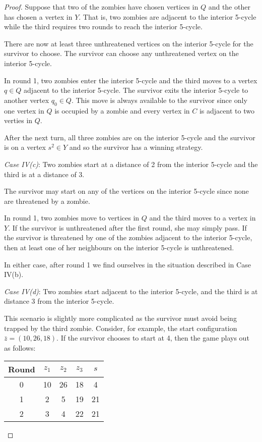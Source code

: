 \begin{proof}
Suppose that two of the zombies have chosen vertices in $Q$ and the other has chosen a vertex in $Y$. That is, two zombies are adjacent to the interior 5-cycle
while the third requires two rounds to reach the interior 5-cycle.

There are now at least three unthreatened vertices on the interior 5-cycle for the survivor to choose. The survivor can choose any unthreatened vertex on
the interior 5-cycle.

In round 1, two zombies enter the interior 5-cycle and the third moves to a vertex $q \in Q$ adjacent to the interior 5-cycle.
The survivor exits the interior 5-cycle to another vertex $q_0 \in Q$. This move is always available to the survivor since only one vertex in $Q$ is occupied by
a zombie and every vertex in $C$ is adjacent to two verties in $Q$.

After the next turn, all three zombies are on the interior 5-cycle and the survivor is on a vertex $s^2 \in Y$ and so the survivor has a winning strategy.

\textit{Case IV(c)}: Two zombies start at a distance of 2 from the interior 5-cycle and the third is at a distance of 3.

The survivor may start on any of the vertices on the interior 5-cycle since none are threatened by a zombie.

In round 1, two zombies move to vertices in $Q$ and the third moves to a vertex in $Y$. If the survivor is unthreatened after the first round, she may simply pass.
If the survivor is threatened by one of the zombies adjacent to the interior 5-cycle, then at least one of her neighbours on the interior 5-cycle is unthreatened.

In either case, after round 1 we find ourselves in the situation described in Case IV(b).

\textit{Case IV(d)}: Two zombies start adjacent to the interior 5-cycle, and the third is at distance 3 from the interior 5-cycle.

This scenario is slightly more complicated as the survivor must avoid being trapped by the third zombie. Consider, for example, the start configuration
$\bar{z} = (10, 26, 18)$. If the survivor chooses to start at 4, then the game plays out as follows:

\begin{tabular}{c | c | c | c | c }
Round & $z_1$ & $z_2$ & $z_3$ & $s$ \\
\hline
0 & 10 & 26 & 18 & 4 \\
1 & 2 & 5 & 19 & 21 \\
2 & 3 & 4 & 22 & 21
\end{tabular}


\end{proof}
